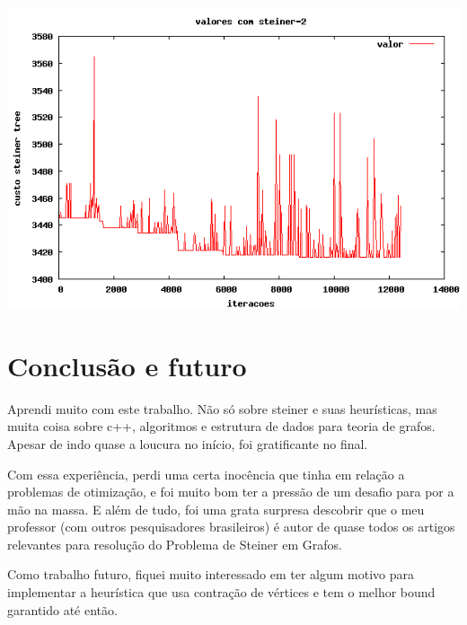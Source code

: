\documentclass[a4paper,10pt,brazilian]{article}
\begin{document}
\includegraphics[scale=0.5]{2graph.png} 

\section{Conclusão e futuro}

Aprendi muito com este trabalho. Não só sobre steiner e suas heurísticas, mas muita coisa sobre c++, algoritmos e estrutura de dados para teoria de grafos. Apesar de indo quase a loucura no início, foi gratificante no final.

Com essa experiência, perdi uma certa inocência que tinha em relação a problemas de otimização, e foi muito bom ter a pressão de um desafio para por a mão na massa. E além de tudo, foi uma grata surpresa descobrir que o meu professor (com outros pesquisadores brasileiros) é autor de quase todos os artigos relevantes para resolução do Problema de Steiner em Grafos.

Como trabalho futuro, fiquei muito interessado em ter algum motivo para implementar a heurística\cite{1071708} que usa contração de vértices e tem o melhor bound garantido até então.

{}

\end{document}

